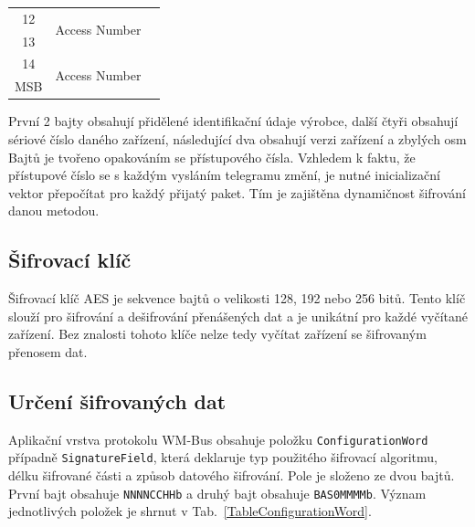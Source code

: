 \begin{table}[!ht]
\begin{center}
\begin{tabular}{|c|c|l|}
12           & \multirow{2}{*}{Access Number} &                                        \\ \cline{1-1}
13           &                                &                                        \\ \cline{1-2}
14           & \multirow{2}{*}{Access Number} &                                        \\ \cline{1-1}
MSB          &                                &                                        \\ \hline \hline
\end{tabular}
\vspace{-20pt}
\end{center}
\end{table}

První 2 bajty obsahují přidělené identifikační údaje výrobce, další čtyři obsahují sériové číslo daného zařízení, následující dva obsahují verzi zařízení a zbylých osm Bajtů je tvořeno opakováním se přístupového čísla. Vzhledem k faktu, že přístupové číslo se s každým vysláním telegramu změní, je nutné inicializační vektor přepočítat pro každý přijatý paket. Tím je zajištěna dynamičnost šifrování danou metodou.

\subsection{Šifrovací klíč}
Šifrovací klíč AES je sekvence bajtů o velikosti 128, 192 nebo 256 bitů. Tento klíč slouží pro šifrování a dešifrování přenášených dat a je unikátní pro každé vyčítané zařízení. Bez znalosti tohoto klíče nelze tedy vyčítat zařízení se šifrovaným přenosem dat.

\newpage{}

\subsection{Určení šifrovaných dat}
\label{KapitolaConfigurationWord}
Aplikační vrstva protokolu WM-Bus obsahuje položku \texttt{ConfigurationWord} případně \texttt{SignatureField}, která deklaruje typ použitého šifrovací algoritmu, délku šifrované části a způsob datového šifrování. Pole je složeno ze dvou bajtů. První bajt obsahuje \texttt{NNNNCCHHb} a druhý bajt obsahuje \texttt{BAS0MMMMb}. Význam jednotlivých položek je shrnut v Tab.~\ref{TableConfigurationWord}.


